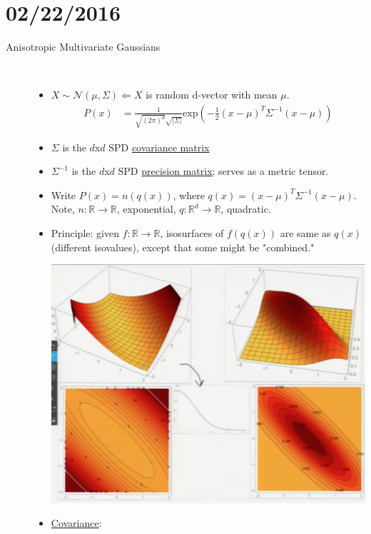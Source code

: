 \documentclass[10pt]{article}
\begin{document}
\section*{02/22/2016}
\begin{description}
	\item[Anisotropic Multivariate Gaussians]
		\
		\begin{itemize}
			\item $X \sim \mathcal{N}(\mu, \Sigma) \Leftarrow X$ is random d-vector with mean $\mu$.
				\begin{align*}
					P(x) &= \frac{1}{\sqrt{(2\pi)^{d}}\sqrt{|\Sigma|}}\text{exp}(-\frac{1}{2}(x-\mu)^{T}\Sigma^{-1}(x-\mu))
				\end{align*}
			\item $\Sigma$ is the $d$x$d$ SPD \underline{covariance matrix}
			\item $\Sigma^{-1}$ is the $d$x$d$ SPD \underline{precision matrix}; serves as a metric tensor.
			\item Write $P(x) = n(q(x))$, where $q(x) = (x-\mu)^{T}\Sigma^{-1}(x-\mu)$. Note, $n: \mathbb{R} \rightarrow \mathbb{R}$, exponential, $q: \mathbb{R}^{d} \rightarrow \mathbb{R}$, quadratic.
			\item Principle: given $f: \mathbb{R} \rightarrow \mathbb{R}$, isosurfaces of $f(q(x))$ are same as $q(x)$ (different isovalues), except that some might be "combined."
				\begin{center}
					\includegraphics[scale=0.5]{images/gaussiantransformation}
				\end{center}
			\item \underline{Covariance}:

\end{itemize}
\end{description}
\end{document}
